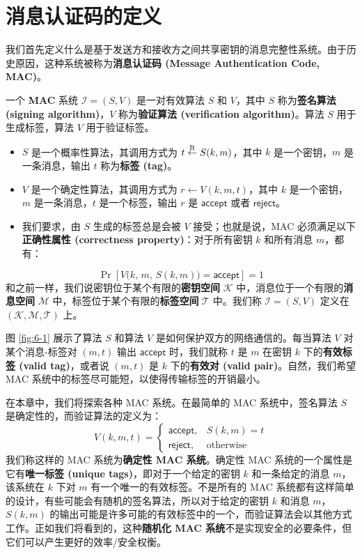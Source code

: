 \section{消息认证码的定义}\label{sec:6-1}

我们首先定义什么是基于发送方和接收方之间共享密钥的消息完整性系统。由于历史原因，这种系统被称为\textbf{消息认证码 (Message Authentication Code, MAC)}。

\begin{definition}\label{def:6-1}
一个 \textbf{MAC} 系统 $\mathcal{I}=(S,V)$ 是一对有效算法 $S$ 和 $V$，其中 $S$ 称为\textbf{签名算法 (signing algorithm)}，$V$ 称为\textbf{验证算法 (verification algorithm)}。算法 $S$ 用于生成标签，算法 $V$ 用于验证标签。
\begin{itemize}
	\item $S$ 是一个概率性算法，其调用方式为 $t\overset{\rm R}\leftarrow S(k,m)$，其中 $k$ 是一个密钥，$m$ 是一条消息，输出 $t$ 称为\textbf{标签 (tag)}。
	\item $V$ 是一个确定性算法，其调用方式为 $r\leftarrow V(k,m,t)$，其中 $k$ 是一个密钥，$m$ 是一条消息，$t$ 是一个标签，输出 $r$ 是 $\mathsf{accept}$ 或者 $\mathsf{reject}$。
	\item 我们要求，由 $S$ 生成的标签总是会被 $V$ 接受；也就是说，MAC 必须满足以下\textbf{正确性属性 (correctness property)}：对于所有密钥 $k$ 和所有消息 $m$，都有：
\end{itemize}
\[
\Pr\left[V\big(k,\,m,\,S(k,m)\big)=\mathsf{accept}\right]=1
\]
和之前一样，我们说密钥位于某个有限的\textbf{密钥空间} $\mathcal{K}$ 中，消息位于一个有限的\textbf{消息空间} $\mathcal{M}$ 中，标签位于某个有限的\textbf{标签空间} $\mathcal{T}$ 中。我们称 $\mathcal{I}=(S,V)$ 定义在 $(\mathcal{K},\mathcal{M},\mathcal{T})$ 上。
\end{definition}

图 \ref{fig:6-1} 展示了算法 $S$ 和算法 $V$ 是如何保护双方的网络通信的。每当算法 $V$ 对某个消息-标签对 $(m,t)$ 输出 $\mathsf{accept}$ 时，我们就称 $t$ 是 $m$ 在密钥 $k$ 下的\textbf{有效标签 (valid tag)}，或者说 $(m,t)$ 是 $k$ 下的\textbf{有效对 (valid pair)}。自然，我们希望 MAC 系统中的标签尽可能短，以使得传输标签的开销最小。

在本章中，我们将探索各种 MAC 系统。在最简单的 MAC 系统中，签名算法 $S$ 是确定性的，而验证算法的定义为：
\[
V(k,m,t)=\left\{
\begin{array}{ll}
\mathsf{accept}, & S(k,m)=t\\
\mathsf{reject}, & \text{otherwise}
\end{array}
\right.
\]
我们称这样的 MAC 系统为\textbf{确定性 MAC 系统}。确定性 MAC 系统的一个属性是它有\textbf{唯一标签 (unique tags)}，即对于一个给定的密钥 $k$ 和一条给定的消息 $m$，该系统在 $k$ 下对 $m$ 有一个唯一的有效标签。不是所有的 MAC 系统都有这样简单的设计，有些可能会有随机的签名算法，所以对于给定的密钥 $k$ 和消息 $m$，$S(k,m)$ 的输出可能是许多可能的有效标签中的一个，而验证算法会以其他方式工作。正如我们将看到的，这种\textbf{随机化 MAC 系统}不是实现安全的必要条件，但它们可以产生更好的效率/安全权衡。

